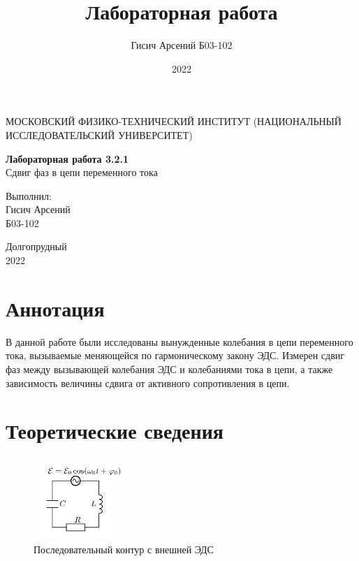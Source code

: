 \documentclass[a4paper, 12pt]{article}
\title{Лабораторная работа}
\author{Гисич Арсений Б03-102}
\date{2022}
\begin{document}
	\begin{center}
		{\large МОСКОВСКИЙ ФИЗИКО-ТЕХНИЧЕСКИЙ ИНСТИТУТ (НАЦИОНАЛЬНЫЙ ИССЛЕДОВАТЕЛЬСКИЙ УНИВЕРСИТЕТ)}
	\end{center}
	\vspace{5 cm}
	{\Large
		\begin{center}
			{\bf Лабораторная работа 3.2.1}\\[0.2 cm]
			Сдвиг фаз в цепи переменного тока
		\end{center}
	}
	\vspace{4 cm}
	\begin{flushright}
		{\Large Выполнил: \\
			\vspace{0.2 cm}
			Гисич Арсений \\
			\vspace{0.2 cm}
			Б03-102 \\}
	\end{flushright}
	\vspace{9 cm}
	\begin{center}
		Долгопрудный\\[0.1 cm]
		2022
	\end{center}
\thispagestyle{empty}

\section{Аннотация}

В данной работе были исследованы вынужденные колебания в цепи переменного тока, вызываемые меняющейся по гармоническому закону ЭДС. Измерен сдвиг фаз между вызывающей колебания ЭДС и колебаниями тока в цепи, а также зависимость величины сдвига от активного сопротивления в цепи.

\section{Теоретические сведения}

\begin{figure}
\includegraphics[width=0.3\textwidth]{1.png}
\caption{Последовательный контур с внешней ЭДС}
\label{r1}
\end{figure}
\end{document}
